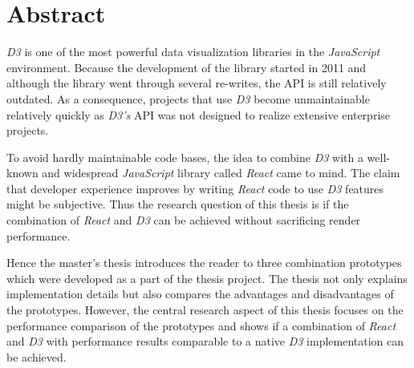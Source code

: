 \chapter{Abstract}

\emph{D3} is one of the most powerful data visualization libraries in the \emph{JavaScript} environment. Because the development of the library started in 2011 and although the library went through several re-writes, the API is still relatively outdated. As a consequence, projects that use \emph{D3} become unmaintainable relatively quickly as \emph{D3's} API was not designed to realize extensive enterprise projects.

To avoid hardly maintainable code bases, the idea to combine \emph{D3} with a well-known and widespread \emph{JavaScript} library called \emph{React} came to mind. The claim that developer experience improves by writing \emph{React} code to use \emph{D3} features might be subjective. Thus the research question of this thesis is if the combination of \emph{React} and \emph{D3} can be achieved without sacrificing render performance.

Hence the master's thesis introduces the reader to three combination prototypes which were developed as a part of the thesis project. The thesis not only explains implementation details but also compares the advantages and disadvantages of the prototypes. However, the central research aspect of this thesis focuses on the performance comparison of the prototypes and shows if a combination of \emph{React} and \emph{D3} with performance results comparable to a native \emph{D3} implementation can be achieved.

